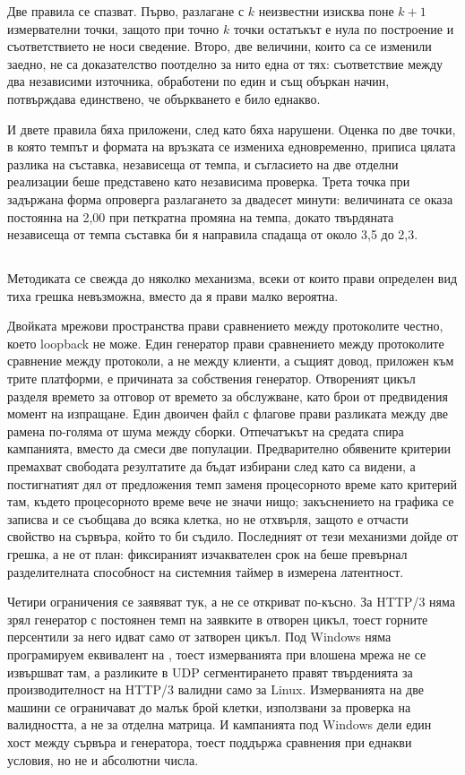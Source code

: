 Две правила се спазват. Първо, разлагане с $k$ неизвестни изисква поне $k+1$ измервателни
точки, защото при точно $k$ точки остатъкът е нула по построение и съответствието не носи
сведение. Второ, две величини, които са се изменили заедно, не са доказателство поотделно за
нито една от тях: съответствие между два независими източника, обработени по един и същ
объркан начин, потвърждава единствено, че объркването е било еднакво.

И двете правила бяха приложени, след като бяха нарушени. Оценка по две точки, в която темпът и
формата на връзката се измениха едновременно, приписа цялата разлика на съставка, независеща
от темпа, и съгласието на две отделни реализации беше представено като независима проверка.
Трета точка при задържана форма опроверга разлагането за двадесет минути: величината се оказа
постоянна на 2,00 при петкратна промяна на темпа, докато твърдяната независеща от темпа
съставка би я направила спадаща от около 3,5 до 2,3.

\subsection{}

Методиката се свежда до няколко механизма, всеки от които прави определен вид тиха грешка
невъзможна, вместо да я прави малко вероятна.

Двойката мрежови пространства прави сравнението между протоколите честно, което loopback не
може. Един генератор прави сравнението между протоколите сравнение между протоколи, а не
между клиенти, а същият довод, приложен към трите платформи, е причината за собствения
генератор. Отвореният цикъл разделя времето за отговор от времето за обслужване, като брои от
предвидения момент на изпращане. Един двоичен файл с флагове прави разликата между две рамена
по-голяма от шума между сборки. Отпечатъкът на средата спира кампанията, вместо да смеси две
популации. Предварително обявените критерии премахват свободата резултатите да бъдат избирани
след като са видени, а постигнатият дял от предложения темп заменя процесорното време като
критерий там, където процесорното време вече не значи нищо; закъснението на графика се записва и
се съобщава до всяка клетка, но не отхвърля, защото е отчасти свойство на сървъра, който то би
съдило. Последният от тези механизми дойде
от грешка, а не от план: фиксираният изчаквателен срок на  беше превърнал
разделителната способност на системния таймер в измерена латентност.

Четири ограничения се заявяват тук, а не се откриват по-късно. За HTTP/3 няма зрял генератор с
постоянен темп на заявките в отворен цикъл, тоест горните персентили за него идват само от
затворен цикъл. Под Windows няма програмируем еквивалент на , тоест измерванията
при влошена мрежа не се извършват там, а разликите в UDP сегментирането правят твърденията
за производителност на HTTP/3 валидни само за Linux. Измерванията на две машини се ограничават
до малък брой клетки, използвани за проверка на валидността, а не за отделна матрица. И
кампанията под Windows дели един хост между сървъра и генератора, тоест поддържа сравнения при
еднакви условия, но не и абсолютни числа.
